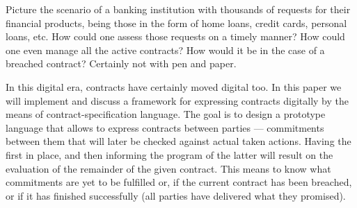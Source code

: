 \documentclass{ituthesis}
\begin{document}

%

Picture the scenario of a banking institution with thousands of requests for their financial products, being those in the form of home loans, credit cards, personal loans, etc. How could one assess those requests on a timely manner? How could one even manage all the active contracts? How would it be in the case of a breached contract? Certainly not with pen and paper.

In this digital era, contracts have certainly moved digital too. In this paper we will implement and discuss a framework for expressing contracts digitally by the means of contract-specification language. The goal is to design a prototype language that allows to express contracts between parties --- commitments between them that will later be checked against actual taken actions. Having the first in place, and then informing the program of the latter will result on the evaluation of the remainder of the given contract. This means to know what commitments are yet to be fulfilled or, if the current contract has been breached, or if it has finished successfully (all parties have delivered what they promised).
\end{document}
